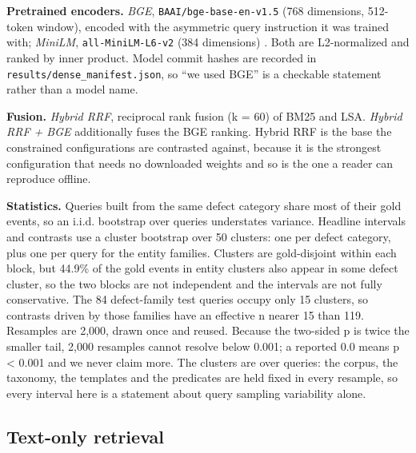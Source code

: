\documentclass[runningheads]{llncs}
\begin{document}
\textbf{Pretrained encoders.} \textit{BGE}, \texttt{BAAI/bge-base-en-v1.5} (768 dimensions, 512-token window), encoded with the asymmetric query instruction it was trained with; \textit{MiniLM}, \texttt{all-MiniLM-L6-v2} (384 dimensions) \cite{reimers2019sbert}. Both are L2-normalized and ranked by inner product. Model commit hashes are recorded in \texttt{results/dense\_\allowbreak{}manifest.json}, so ``we used BGE'' is a checkable statement rather than a model name.

\textbf{Fusion.} \textit{Hybrid RRF}, reciprocal rank fusion (k = 60) of BM25 and LSA. \textit{Hybrid RRF + BGE} additionally fuses the BGE ranking. Hybrid RRF is the base the constrained configurations are contrasted against, because it is the strongest configuration that needs no downloaded weights and so is the one a reader can reproduce offline.

\textbf{Statistics.} Queries built from the same defect category share most of their gold events, so an i.i.d. bootstrap over queries understates variance. Headline intervals and contrasts use a cluster bootstrap over 50 clusters: one per defect category, plus one per query for the entity families. Clusters are gold-disjoint within each block, but 44.9\% of the gold events in entity clusters also appear in some defect cluster, so the two blocks are not independent and the intervals are not fully conservative. The 84 defect-family test queries occupy only 15 clusters, so contrasts driven by those families have an effective n nearer 15 than 119. Resamples are 2,000, drawn once and reused. Because the two-sided p is twice the smaller tail, 2,000 resamples cannot resolve below 0.001; a reported 0.0 means p < 0.001 and we never claim more. The clusters are over queries: the corpus, the taxonomy, the templates and the predicates are held fixed in every resample, so every interval here is a statement about query sampling variability alone.


\subsection{Text-only retrieval}
\end{document}
